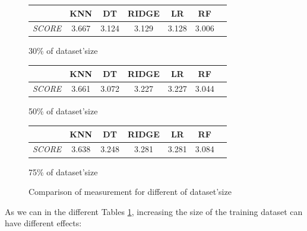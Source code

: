 \documentclass[12pt, titlepage]{article}
\begin{document}
\begin{figure}[ht]
\begin{subtable}{0.4\textwidth}
\begin{tabular}{|l|c|c|c|c|c|c|}
        & \textbf{KNN} & \textbf{DT} & \textbf{RIDGE} & \textbf{LR} & \textbf{RF} \\
        \hline
        \textit{SCORE} & 3.667 & 3.124 & 3.129 & 3.128 & 3.006 \\
        \hline
    \end{tabular}
        \caption{30\% of dataset'size}
        \label{tab:table2}
    \end{subtable}
    \hspace{2.5cm}
    \begin{subtable}{0.4\textwidth}
        \flushleft
        \footnotesize %
        \begin{tabular}{|l|c|c|c|c|c|c|}
        \hline
        & \textbf{KNN} & \textbf{DT} & \textbf{RIDGE} & \textbf{LR} & \textbf{RF} \\
        \hline
        \textit{SCORE} & 3.661 & 3.072 & 3.227 & 3.227 & 3.044 \\
        \hline
    \end{tabular}
        \caption{50\% of dataset'size}
        \label{tab:table2}
    \end{subtable}
    \hspace{2.5cm}
    \begin{subtable}{0.4\textwidth}
        \flushleft
        \footnotesize %
        \begin{tabular}{|l|c|c|c|c|c|c|}
        \hline
        & \textbf{KNN} & \textbf{DT} & \textbf{RIDGE} & \textbf{LR} & \textbf{RF} \\
        \hline
        \textit{SCORE} & 3.638 & 3.248 & 3.281 & 3.281 & 3.084 \\
        \hline
    \end{tabular}
        \caption{75\% of dataset'size}
        \label{tab:table2}
    \end{subtable}
    \caption{Comparison of measurement for different of dataset'size}
    \label{fig:two-tables}
\end{figure}


As we can in the different Tables \ref{fig:two-tables}, increasing the size of the training dataset can have different effects: 
\end{document}
